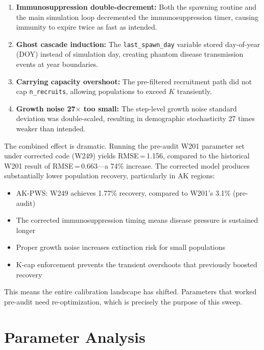\documentclass[11pt,a4paper]{article}
\begin{document}
\begin{enumerate}[leftmargin=*]
    \item \textbf{Immunosuppression double-decrement:} Both the spawning routine and the main simulation loop decremented the immunosuppression timer, causing immunity to expire twice as fast as intended.
    \item \textbf{Ghost cascade induction:} The \texttt{last\_spawn\_day} variable stored day-of-year (DOY) instead of simulation day, creating phantom disease transmission events at year boundaries.
    \item \textbf{Carrying capacity overshoot:} The pre-filtered recruitment path did not cap \texttt{n\_recruits}, allowing populations to exceed $K$ transiently.
    \item \textbf{Growth noise 27$\times$ too small:} The step-level growth noise standard deviation was double-scaled, resulting in demographic stochasticity 27 times weaker than intended.
\end{enumerate}

The combined effect is dramatic. Running the pre-audit W201 parameter set under corrected code (W249) yields RMSE\,=\,1.156, compared to the historical W201 result of RMSE\,=\,0.663---a 74\% increase. The corrected model produces substantially lower population recovery, particularly in AK regions:

\begin{itemize}
    \item AK-PWS: W249 achieves 1.77\% recovery, compared to W201's 3.1\% (pre-audit)
    \item The corrected immunosuppression timing means disease pressure is sustained longer
    \item Proper growth noise increases extinction risk for small populations
    \item K-cap enforcement prevents the transient overshoots that previously boosted recovery
\end{itemize}

This means the entire calibration landscape has shifted. Parameters that worked pre-audit need re-optimization, which is precisely the purpose of this sweep.

\section{Parameter Analysis}
\end{document}
